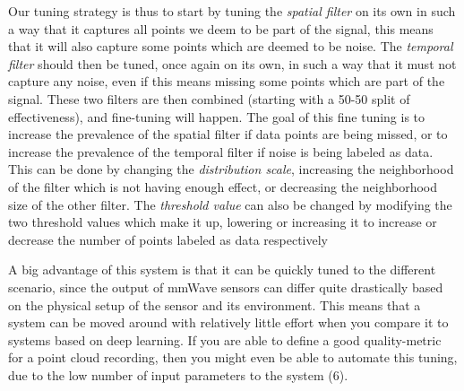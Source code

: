 Our tuning strategy is thus to start by tuning the \textit{spatial filter} on its own in such a way that it captures all points we deem to be part of the signal, this means that it will also capture some points which are deemed to be noise.
The \textit{temporal filter} should then be tuned, once again on its own, in such a way that it must not capture any noise, even if this means missing some points which are part of the signal.
These two filters are then combined (starting with a 50-50 split of effectiveness), and fine-tuning will happen. 
The goal of this fine tuning is to increase the prevalence of the spatial filter if data points are being missed, or to increase the prevalence of the temporal filter if noise is being labeled as data.
This can be done by changing the \textit{distribution scale}, increasing the neighborhood of the filter which is not having enough effect, or decreasing the neighborhood size of the other filter. 
The \textit{threshold value} can also be changed by modifying the two threshold values which make it up, lowering or increasing it to increase or decrease the number of points labeled as data respectively

A big advantage of this system is that it can be quickly tuned to the different scenario, since the output of mmWave sensors can differ quite drastically based on the physical setup of the sensor and its environment.
This means that a system can be moved around with relatively little effort when you compare it to systems based on deep learning.
If you are able to define a good quality-metric for a point cloud recording, then you might even be able to automate this tuning, due to the low number of input parameters to the system (6).


